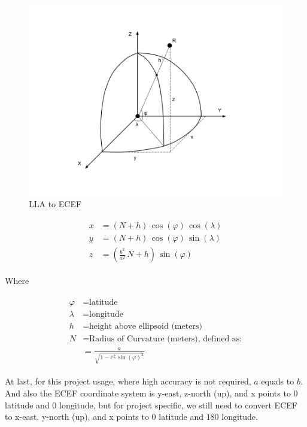 \begin{figure}[H]
\centering
\includegraphics[width=\linewidth]{Figures/lla2ecef.png}
\decoRule
\caption[lla2ecef]{LLA to ECEF}
\end{figure}

\[
\begin{array}{lr}
\begin{aligned}
x &= (N + h)\,\cos(\varphi)\,\cos(\lambda) \\
y &= (N + h)\,\cos(\varphi)\,\sin(\lambda) \\
z &= (\frac{b^2}{a^2}\,N + h)\,\sin(\varphi)
\end{aligned}
\end{array}
\]

Where

\[
\begin{array}{lr}
\begin{aligned}
\varphi &= \text{latitude} \\
\lambda &= \text{longitude} \\
h &= \text{height above ellipsoid (meters)} \\
N &= \text{Radius of Curvature (meters), defined as:} \\
&= \frac{a}{\sqrt{1 - e^2\,\sin(\varphi)^2}}
\end{aligned}
\end{array}
\]

At last, for this project usage, where high accuracy is not required, $a$ equals to $b$. And also the ECEF coordinate system is y-east, z-north (up), and x points to $0$ latitude and $0$ longitude, but for project specific, we still need to convert ECEF to x-east, y-north (up), and x points to $0$ latitude and $180$ longitude.

